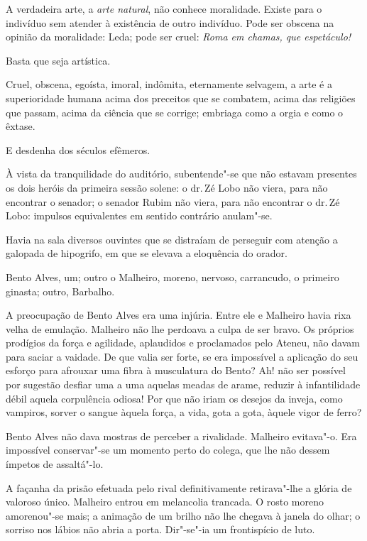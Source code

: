 A verdadeira arte, a \textit{arte natural}, não conhece
moralidade. Existe para o indivíduo sem atender à existência de outro
indivíduo. Pode ser obscena na opinião da moralidade: Leda; pode ser
cruel: \textit{Roma em chamas, que espetáculo!} 

Basta que seja artística. 

Cruel, obscena, egoísta, imoral, indômita, eternamente selvagem, a arte é a
superioridade humana acima dos preceitos que se combatem, acima das
religiões que passam, acima da ciência que se corrige; embriaga como a
orgia e como o êxtase. 

E desdenha dos séculos efêmeros. 

\noindent\dotfill

À vista da tranquilidade do auditório, subentende"-se que não estavam presentes
os dois heróis da primeira sessão solene: o dr.\,Zé Lobo não viera, para
não encontrar o senador; o senador Rubim não viera, para não encontrar
o dr.\,Zé Lobo: impulsos equivalentes em sentido contrário anulam"-se.

Havia na sala diversos ouvintes que se distraíam de perseguir com
atenção a galopada de hipogrifo, em que se elevava a eloquência do
orador. 

Bento Alves, um; outro o Malheiro, moreno, nervoso, carrancudo,
o primeiro ginasta; outro, Barbalho. 

A preocupação de Bento Alves era
uma injúria. Entre ele e Malheiro havia rixa velha de emulação.
Malheiro não lhe perdoava a culpa de ser bravo. Os próprios prodígios
da força e agilidade, aplaudidos e proclamados pelo Ateneu, não davam
para saciar a vaidade. De que valia ser forte, se era impossível a
aplicação do seu esforço para afrouxar uma fibra à musculatura do
Bento? Ah! não ser possível por sugestão desfiar uma a uma aquelas
meadas de arame, reduzir à infantilidade débil aquela corpulência
odiosa! Por que não iriam os desejos da inveja, como vampiros, sorver o
sangue àquela força, a vida, gota a gota, àquele vigor de ferro? 

Bento Alves não dava mostras de perceber a rivalidade. Malheiro evitava"-o.
Era impossível conservar"-se um momento perto do colega, que lhe não
dessem ímpetos de assaltá"-lo. 

A façanha da prisão efetuada pelo rival
definitivamente retirava"-lhe a glória de valoroso único. Malheiro
entrou em melancolia trancada. O rosto moreno amorenou"-se mais; a
animação de um brilho não lhe chegava à janela do olhar; o sorriso nos
lábios não abria a porta. Dir"-se"-ia um frontispício de luto. 

